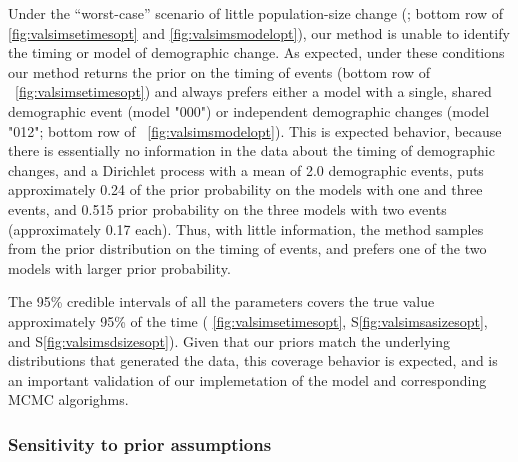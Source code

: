 \ifembed{

}{}

Under the ``worst-case'' scenario of little population-size change
(\vsimnochange; bottom row of \figs \ref{fig:valsimsetimesopt} and
\ref{fig:valsimsmodelopt}),
our method is unable to identify the timing or model of demographic change.
As expected, under these conditions our method returns the prior on the timing
of events (bottom row of \fig{}~\ref{fig:valsimsetimesopt})
and always prefers either a model with a single, shared demographic
event (model "000") or independent demographic changes (model "012";
bottom row of \fig{}~\ref{fig:valsimsmodelopt}).
This is expected behavior, because there is essentially no information in the
data about the timing of demographic changes, and a Dirichlet process with a
mean of 2.0 demographic events, puts approximately 0.24 of the prior
probability on the models with one and three events, and 0.515 prior
probability on the three models with two events (approximately 0.17 each).
Thus, with little information, the method samples from the prior distribution
on the timing of events, and prefers one of the two models with larger prior
probability.

The 95\% credible intervals of all the parameters
covers the true value approximately 95\% of the time
(\figs
\ref{fig:valsimsetimesopt},
S\ref{fig:valsimsasizesopt},
and
S\ref{fig:valsimsdsizesopt}).
Given that our priors match the underlying distributions that generated the
data, this coverage behavior is expected, and is an important validation
of our implemetation of the model and corresponding MCMC algorighms.


\subsubsection{Sensitivity to prior assumptions}

